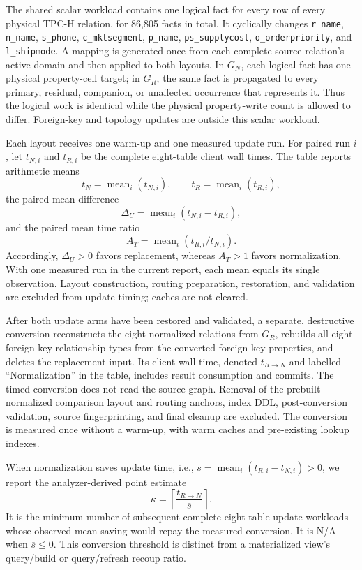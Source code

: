 \documentclass[sigconf]{acmart}
\begin{document}
The shared scalar workload contains one logical fact for every row of every
physical TPC-H relation, for 86,805 facts in total. It cyclically changes
\texttt{r\_name}, \texttt{n\_name}, \texttt{s\_phone},
\texttt{c\_mktsegment}, \texttt{p\_name}, \texttt{ps\_supplycost},
\texttt{o\_orderpriority}, and \texttt{l\_shipmode}. A mapping is generated
once from each complete source relation's active domain and then applied to
both layouts. In $G_N$, each logical fact has one physical property-cell
target; in $G_R$, the same fact is propagated to every primary, residual,
companion, or unaffected occurrence that represents it. Thus the logical work
is identical while the physical property-write count is allowed to differ.
Foreign-key and topology updates are outside this scalar workload.

Each layout receives one warm-up and one measured update run. For paired run
$i$, let $t_{N,i}$ and $t_{R,i}$ be the complete eight-table client wall times.
The table reports arithmetic means
\[
 t_N=\operatorname{mean}_i(t_{N,i}),\qquad
 t_R=\operatorname{mean}_i(t_{R,i}),
\]
the paired mean difference
\[
 \Delta_U=\operatorname{mean}_i(t_{N,i}-t_{R,i}),
\]
and the paired mean time ratio
\[
 A_T=\operatorname{mean}_i(t_{R,i}/t_{N,i}).
\]
Accordingly, $\Delta_U>0$ favors replacement, whereas $A_T>1$ favors
normalization. With one measured run in the current report, each mean equals
its single observation. Layout construction, routing preparation, restoration,
and validation are excluded from update timing; caches are not cleared.

After both update arms have been restored and validated, a separate,
destructive conversion reconstructs the eight normalized relations from
$G_R$, rebuilds all eight foreign-key relationship types from the converted
foreign-key properties, and deletes the replacement input. Its client wall
time, denoted $t_{R\rightarrow N}$ and labelled ``Normalization'' in the table,
includes result consumption and commits. The timed conversion does not read
the source graph. Removal of the prebuilt normalized comparison layout and
routing anchors, index DDL, post-conversion validation, source fingerprinting,
and final cleanup are excluded. The conversion is measured once without a
warm-up, with warm caches and pre-existing lookup indexes.

When normalization saves update time, i.e.,
$\overline{s}=\operatorname{mean}_i(t_{R,i}-t_{N,i})>0$, we report the
analyzer-derived point estimate
\[
  \kappa=\left\lceil
  \frac{t_{R\rightarrow N}}{\overline{s}}
  \right\rceil .
\]
It is the minimum number of subsequent complete eight-table update workloads
whose observed mean saving would repay the measured conversion. It is N/A
when $\overline{s}\leq0$. This conversion threshold is distinct from a
materialized view's query/build or query/refresh recoup ratio.
\end{document}
